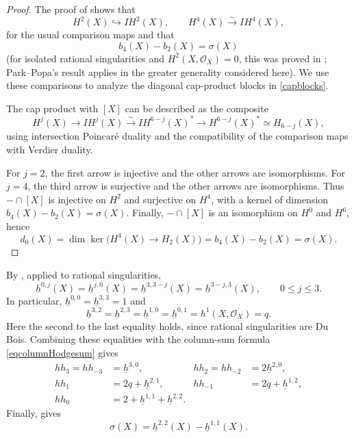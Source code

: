 \documentclass{amsart}
\theoremstyle{plain}
\theoremstyle{definition}
\begin{document}
\begin{proof}

The proof of \cite[Theorem~E, Section~7]{PP25b} shows that
\[
H^2(X)\hookrightarrow IH^2(X),
\qquad
H^4(X)\xrightarrow{\sim}IH^4(X),
\]
for the usual comparison maps and that
\[
b_4(X)-b_2(X)=\sigma(X)
\]
(for isolated rational singularities and $H^2(X,\mathcal O_X)=0$, this was proved in \cite[Theorem~3.2]{NS95}; Park--Popa's result applies in the greater generality considered here). We use these comparisons to analyze the diagonal cap-product blocks in \eqref{capblocks}.
 
The cap product with $[X]$ can be described as the composite
\begin{equation}\label{capviaIH}
H^j(X)\longrightarrow IH^j(X)
\xrightarrow{\sim}IH^{6-j}(X)^*
\longrightarrow H^{6-j}(X)^*
\simeq H_{6-j}(X),
\end{equation}
using intersection Poincar\'e duality and the compatibility of the comparison maps with Verdier duality.

For $j=2$, the first arrow is injective and the other arrows are isomorphisms. For $j=4$, the third arrow is surjective and the other arrows are isomorphisms. Thus $-\cap[X]$ is injective on $H^2$ and surjective on $H^4$, with a kernel of dimension $b_4(X)-b_2(X)=\sigma(X)$. Finally, $-\cap[X]$ is an isomorphism on $H^0$ and $H^6$, hence
\[
d_0(X)=\dim\ker\bigl(H^4(X)\to H_2(X)\bigr)
=b_4(X)-b_2(X)=\sigma(X).
\]\end{proof}
By \cite[Theorem~A]{PP25a}, applied to rational singularities,
\begin{equation}\label{ParkPopasymmetries}
\underline h^{0,j}(X)=\underline h^{j,0}(X)
=\underline h^{3,3-j}(X)=\underline h^{3-j,3}(X),
\qquad 0\leq j\leq3.
\end{equation}
In particular,
$\underline h^{0,0}=\underline h^{3,3}=1$ and
\[
\underline h^{3,2}=\underline h^{2,3}=\underline h^{1,0}=\underline h^{0,1}=h^1(X,\mathcal O_X)=q.
\]
Here the second to the last equality holds, since rational singularities are Du Bois.
Combining these equalities with the column-sum formula
\eqref{eqcolumnHodgesum} gives
\[
\begin{aligned}
hh_3=hh_{-3}&=\underline h^{3,0},&
hh_2=hh_{-2}&=2\underline h^{2,0},\\
hh_1&=2q+\underline h^{2,1},&
hh_{-1}&=2q+\underline h^{1,2},\\
hh_0&=2+\underline h^{1,1}+\underline h^{2,2}.
\end{aligned}
\]
Finally, \cite[Theorem~E]{PP25b} gives
\[
\sigma(X)=\underline h^{2,2}(X)-\underline h^{1,1}(X).
\]
\end{document}
